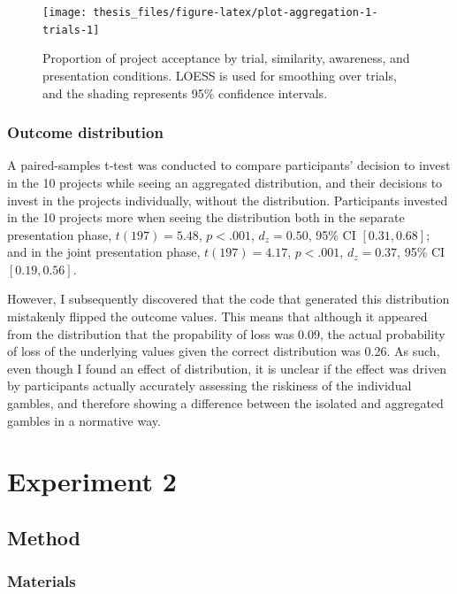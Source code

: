 \documentclass[a4paper, nobind, dvipsnames]{templates/ociamthesis}
\theoremstyle{definition}
\theoremstyle{definition}
\theoremstyle{definition}
\theoremstyle{definition}
\theoremstyle{remark}
\begin{document}
\begin{figure}
\texttt{[image: thesis\_files/figure-latex/plot-aggregation-1-trials-1]} \caption{Proportion of project acceptance by trial, similarity, awareness, and presentation conditions. LOESS is used for smoothing over trials, and the shading represents 95\% confidence intervals.}\label{fig:plot-aggregation-1-trials}
\end{figure}

\hypertarget{outcome-distribution-aggregation-1}{%
\subsubsection{Outcome distribution}\label{outcome-distribution-aggregation-1}}

A paired-samples t-test was conducted to compare participants' decision to
invest in the 10 projects while seeing an aggregated distribution, and their
decisions to invest in the projects individually, without the distribution.
Participants invested in the 10 projects more when seeing the distribution both
in the separate presentation phase,
\(t(197) = 5.48\), \(p < .001\), \(d_z = 0.50\), 95\% CI \([0.31, 0.68]\); and in the joint
presentation phase, \(t(197) = 4.17\), \(p < .001\), \(d_z = 0.37\), 95\% CI \([0.19, 0.56]\).

However, I subsequently discovered that the code that generated this
distribution mistakenly flipped the outcome values. This means that although it
appeared from the distribution that the propability of loss was
0.09, the actual probability of loss of the
underlying values given the correct distribution was
0.26. As such, even though I found an
effect of distribution, it is unclear if the effect was driven by participants
actually accurately assessing the riskiness of the individual gambles, and
therefore showing a difference between the isolated and aggregated gambles in a
normative way.

\hypertarget{experiment-2-1}{%
\section{Experiment 2}\label{experiment-2-1}}

\hypertarget{method-7}{%
\subsection{Method}\label{method-7}}

\hypertarget{materials-6}{%
\subsubsection{Materials}\label{materials-6}}
\end{document}
